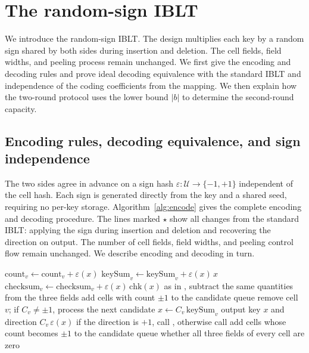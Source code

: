 \section{The random-sign IBLT}\label{sec:design}
We introduce the random-sign IBLT. The design multiplies each key by a random sign shared by both sides during insertion and deletion. The cell fields, field widths, and peeling process remain unchanged. We first give the encoding and decoding rules and prove ideal decoding equivalence with the standard IBLT and independence of the coding coefficients from the mapping. We then explain how the two-round protocol uses the lower bound $|b|$ to determine the second-round capacity.

\subsection{Encoding rules, decoding equivalence, and sign independence}
The two sides agree in advance on a sign hash $\varepsilon:\mathcal U\to\{-1,+1\}$ independent of the cell hash. Each sign is generated directly from the key and a shared seed, requiring no per-key storage. Algorithm~\ref{alg:encode} gives the complete encoding and decoding procedure. The lines marked $\star$ show all changes from the standard IBLT: applying the sign during insertion and deletion and recovering the direction on output. The number of cell fields, field widths, and peeling control flow remain unchanged. We describe encoding and decoding in turn.

\begin{algorithm}[!htbp]
\caption{Encoding and decoding of the random-sign IBLT. Lines marked $\star$ differ from the standard IBLT; field arithmetic is modulo $2^{64}$.}
\label{alg:encode}
\begin{algorithmic}[1]
\State $\mathrm{count}_v\gets\mathrm{count}_v+\varepsilon(x)$
\State $\mathrm{keySum}_v\gets\mathrm{keySum}_v+\varepsilon(x)\,x$
\State $\mathrm{checksum}_v\gets\mathrm{checksum}_v+\varepsilon(x)\,\mathrm{chk}(x)$
\EndFor
\EndProcedure
{}
\State as in , subtract the same quantities from the three fields
\EndProcedure
{}
\State add cells with count $\pm1$ to the candidate queue
\State remove cell $v$; if $C_v\ne\pm1$, process the next candidate
\State $x\gets C_v\,\mathrm{keySum}_v$
\State output key $x$ and direction $C_v\,\varepsilon(x)$
\State if the direction is $+1$, call , otherwise call 
\State add cells whose count becomes $\pm1$ to the candidate queue
\EndIf
\EndWhile
\State \Return whether all three fields of every cell are zero
\EndProcedure
\end{algorithmic}
\end{algorithm}

